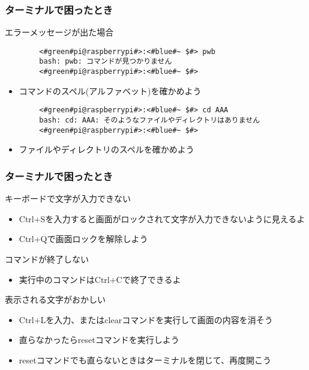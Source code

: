 \begin{frame}[fragile]
    \frametitle{ターミナルで困ったとき}
    エラーメッセージが出た場合
    \begin{lstlisting}
        <#green#pi@raspberrypi#>:<#blue#~ $#> pwb
        bash: pwb: コマンドが見つかりません
        <#green#pi@raspberrypi#>:<#blue#~ $#> 
        \end{lstlisting}
    \begin{itemize}
        \item コマンドのスペル(アルファベット)を確かめよう
    \end{itemize}
    \begin{lstlisting}
        <#green#pi@raspberrypi#>:<#blue#~ $#> cd AAA
        bash: cd: AAA: そのようなファイルやディレクトリはありません
        <#green#pi@raspberrypi#>:<#blue#~ $#> 
        \end{lstlisting}
    \begin{itemize}
        \item ファイルやディレクトリのスペルを確かめよう
    \end{itemize}
\end{frame}

\begin{frame}
    \frametitle{ターミナルで困ったとき}
    キーボードで文字が入力できない
    \begin{itemize}
        \item Ctrl+Sを入力すると画面がロックされて文字が入力できないように見えるよ
        \item Ctrl+Qで画面ロックを解除しよう
    \end{itemize}
    コマンドが終了しない
    \begin{itemize}
        \item 実行中のコマンドはCtrl+Cで終了できるよ
    \end{itemize}
    表示される文字がおかしい
    \begin{itemize}
        \item Ctrl+Lを入力、またはclearコマンドを実行して画面の内容を消そう
        \item 直らなかったらresetコマンドを実行しよう
        \item resetコマンドでも直らないときはターミナルを閉じて、再度開こう
    \end{itemize}
\end{frame}

